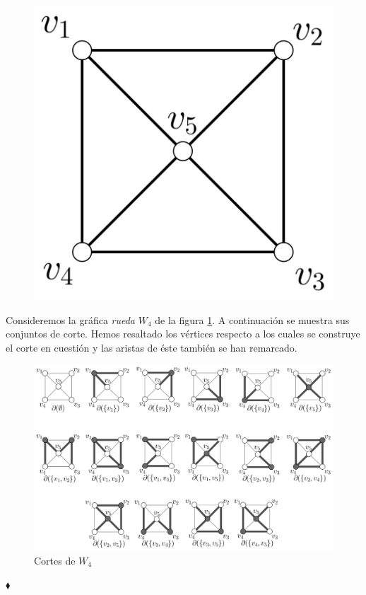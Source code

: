 \vspace{1cm}
\begin{ejem}
\begin{figure}[H]
    \centering
    \includegraphics[scale=0.2]{img/imgchapter2/wheel.jpg}
    \caption{}
    \label{fig:wheel}
\end{figure}

Consideremos la gráfica \textit{rueda} $W_{4}$ de la figura \ref{fig:wheel}.
A continuación se muestra sus conjuntos de corte. Hemos resaltado los vértices respecto a los cuales se construye el corte en cuestión y las aristas de éste también se han remarcado. 

\begin{figure}[H]
    \centering
    \includegraphics[scale=0.6]{img/imgchapter2/espaciocortes.jpg}
    \caption{Cortes de $W_{4}$}
    \label{fig:cortesw4}
\end{figure}

\hfill $\blacklozenge$
\end{ejem}


